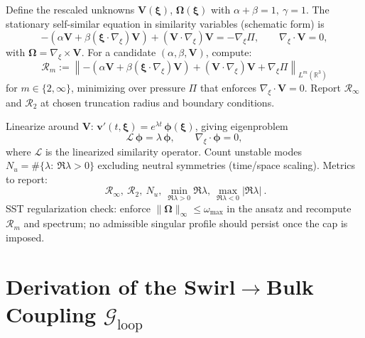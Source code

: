 \documentclass[10pt,reprint,aps,onecolumn,nofootinbib]{revtex4-2}
\begin{document}
Define the rescaled unknowns \(\mathbf{V}(\boldsymbol{\xi})\), \(\boldsymbol{\Omega}(\boldsymbol{\xi})\) with \(\alpha+\beta=1,\ \gamma=1\).
The stationary self-similar equation in similarity variables (schematic form) is
\[
    -\left(\alpha \mathbf{V} + \beta (\boldsymbol{\xi}\!\cdot\!\nabla_{\!\xi})\mathbf{V}\right)
    + (\mathbf{V}\!\cdot\!\nabla_{\!\xi})\mathbf{V} = -\nabla_{\!\xi} \Pi,\qquad
    \nabla_{\!\xi}\!\cdot\!\mathbf{V}=0,
\]
with \(\boldsymbol{\Omega}=\nabla_{\!\xi}\times\mathbf{V}\).
For a candidate \((\alpha,\beta,\mathbf{V})\), compute:
\[
    \mathcal{R}_m := \left\lVert
                         -\left(\alpha \mathbf{V} + \beta (\boldsymbol{\xi}\!\cdot\!\nabla_{\!\xi})\mathbf{V}\right)
                         + (\mathbf{V}\!\cdot\!\nabla_{\!\xi})\mathbf{V} + \nabla_{\!\xi}\Pi
    \right\rVert_{L^m(\mathbb{R}^3)}
\]
for \(m\in\{2,\infty\}\), minimizing over pressure \(\Pi\) that enforces \(\nabla_{\!\xi}\!\cdot\!\mathbf{V}=0\).
Report \(\mathcal{R}_\infty\) and \(\mathcal{R}_2\) at chosen truncation radius and boundary conditions.

Linearize around \(\mathbf{V}\): \(\mathbf{v}'(t,\boldsymbol{\xi})=e^{\lambda t}\,\boldsymbol{\phi}(\boldsymbol{\xi})\), giving eigenproblem
\[
    \mathcal{L}\,\boldsymbol{\phi}=\lambda\,\boldsymbol{\phi},\qquad \nabla_{\!\xi}\!\cdot\!\boldsymbol{\phi}=0,
\]
where \(\mathcal{L}\) is the linearized similarity operator.
Count unstable modes \(N_u = \#\{\lambda:\ \Re\lambda>0\}\) excluding neutral symmetries (time/space scaling).
Metrics to report:
\[
    \boxed{
        \ \mathcal{R}_\infty,\ \mathcal{R}_2,\ N_u,\ \min_{\Re\lambda>0}\Re\lambda,\ \max_{\Re\lambda<0}|\Re\lambda|
        \ } .
\]
SST regularization check: enforce \(\lVert \boldsymbol{\Omega}\rVert_\infty\le \omega_{\max}\) in the ansatz and recompute \(\mathcal{R}_m\) and spectrum; no admissible singular profile should persist once the cap is imposed.

\section{Derivation of the Swirl$\to$Bulk Coupling \texorpdfstring{$\mathcal{G}_{\text{loop}}$}{G\_loop}}
\label{app:Gloop}
\end{document}
